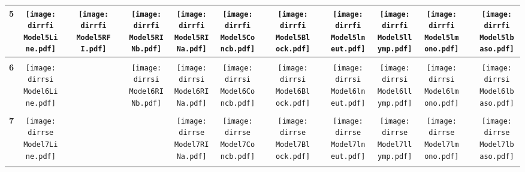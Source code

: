 \documentclass[landscape,a1paper, onecolumn]{paper}
\def \dirrfi {/run/user/1000/gvfs/smb-share:server=cyfiles.iastate.edu,share=09/22/ntyet/R/RA/Data/RFI-newdata/result4/Model5.Line.RFI.Concb.RINb.RINa.lneut.llymp.lmono.lbaso.Block/}
\def \dirrsi{/run/user/1000/gvfs/smb-share:server=cyfiles.iastate.edu,share=09/22/ntyet/R/RA/Data/RFI-newdata/result4/Model6.Line.Concb.RINb.RINa.lneut.llymp.lmono.lbaso.Block/}
\def \dirrse{/run/user/1000/gvfs/smb-share:server=cyfiles.iastate.edu,share=09/22/ntyet/R/RA/Data/RFI-newdata/result4/Model7.Line.Concb.RINa.lneut.llymp.lmono.lbaso.Block/}
\begin{document}
\begin{table}
\begin{tabular}{cccccccccccccccc}
     {\Huge \textbf{5}} 
      &\texttt{[image: \\dirrfi Model5Line.pdf]}
      &
      &\texttt{[image: \\dirrfi Model5RFI.pdf]}
      &
      &\texttt{[image: \\dirrfi Model5RINb.pdf]}
      &\texttt{[image: \\dirrfi Model5RINa.pdf]}
      &\texttt{[image: \\dirrfi Model5Concb.pdf]}
      &
      &\texttt{[image: \\dirrfi Model5Block.pdf]}
      &
      &\texttt{[image: \\dirrfi Model5lneut.pdf]}
      &\texttt{[image: \\dirrfi Model5llymp.pdf]}
      &\texttt{[image: \\dirrfi Model5lmono.pdf]}
      &
      &\texttt{[image: \\dirrfi Model5lbaso.pdf]}
     \\[5pt]
     \hline
     \\[5pt]
     
     {\Huge \textbf{6}} 
      &\texttt{[image: \\dirrsi Model6Line.pdf]}
      &
      &
      &
      &\texttt{[image: \\dirrsi Model6RINb.pdf]}
      &\texttt{[image: \\dirrsi Model6RINa.pdf]}
      &\texttt{[image: \\dirrsi Model6Concb.pdf]}
      &
      &\texttt{[image: \\dirrsi Model6Block.pdf]}
      &
      &\texttt{[image: \\dirrsi Model6lneut.pdf]}
      &\texttt{[image: \\dirrsi Model6llymp.pdf]}
      &\texttt{[image: \\dirrsi Model6lmono.pdf]}
      &
      &\texttt{[image: \\dirrsi Model6lbaso.pdf]}
     \\[5pt]
     \hline
     \\[5pt]
     {\Huge \textbf{7}} 
      &\texttt{[image: \\dirrse Model7Line.pdf]}
      &
      &
      &
      &
      &\texttt{[image: \\dirrse Model7RINa.pdf]}
      &\texttt{[image: \\dirrse Model7Concb.pdf]}
      &
      &\texttt{[image: \\dirrse Model7Block.pdf]}
      &
      &\texttt{[image: \\dirrse Model7lneut.pdf]}
      &\texttt{[image: \\dirrse Model7llymp.pdf]}
      &\texttt{[image: \\dirrse Model7lmono.pdf]}
      &
      &\texttt{[image: \\dirrse Model7lbaso.pdf]}
     \\[5pt]
     \hline
     \\[5pt]
     
\end{tabular}
\end{table}
\end{document}

